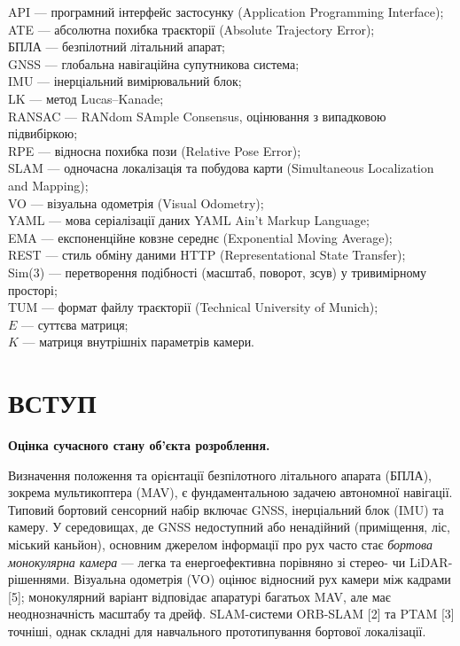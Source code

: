 \documentclass[14pt,a4paper,openany]{extreport}
\newcommand{\structpart}[1]{%
  \clearpage
  \chapter*{\bfseries\MakeUppercase{#1}}
  \addcontentsline{toc}{chapter}{#1}%
}
\newcommand{\introheading}[1]{%
  \par\addvspace{0.5\baselineskip}%
  \noindent\textbf{#1}\par
}
\begin{document}
\noindent
API --- програмний інтерфейс застосунку (Application Programming Interface);\\
ATE --- абсолютна похибка траєкторії (Absolute Trajectory Error);\\
БПЛА --- безпілотний літальний апарат;\\
GNSS --- глобальна навігаційна супутникова система;\\
IMU --- інерціальний вимірювальний блок;\\
LK --- метод Lucas--Kanade;\\
RANSAC --- RANdom SAmple Consensus, оцінювання з випадковою підвибіркою;\\
RPE --- відносна похибка пози (Relative Pose Error);\\
SLAM --- одночасна локалізація та побудова карти (Simultaneous Localization and Mapping);\\
VO --- візуальна одометрія (Visual Odometry);\\
YAML --- мова серіалізації даних YAML Ain't Markup Language;\\
EMA --- експоненційне ковзне середнє (Exponential Moving Average);\\
REST --- стиль обміну даними HTTP (Representational State Transfer);\\
Sim(3) --- перетворення подібності (масштаб, поворот, зсув) у тривимірному просторі;\\
TUM --- формат файлу траєкторії (Technical University of Munich);\\
$E$ --- суттєва матриця;\\
$K$ --- матриця внутрішніх параметрів камери.

\structpart{Вступ}

\introheading{Оцінка сучасного стану об'єкта розроблення.}

Визначення положення та орієнтації безпілотного літального апарата (БПЛА), зокрема мультикоптера (MAV), є фундаментальною задачею автономної навігації. Типовий бортовий сенсорний набір включає GNSS, інерціальний блок (IMU) та камеру. У середовищах, де GNSS недоступний або ненадійний (приміщення, ліс, міський каньйон), основним джерелом інформації про рух часто стає \emph{бортова монокулярна камера} --- легка та енергоефективна порівняно зі стерео- чи LiDAR-рішеннями. Візуальна одометрія (VO) оцінює відносний рух камери між кадрами [5]; монокулярний варіант відповідає апаратурі багатьох MAV, але має неоднозначність масштабу та дрейф. SLAM-системи ORB-SLAM [2] та PTAM [3] точніші, однак складні для навчального прототипування бортової локалізації.
\end{document}
